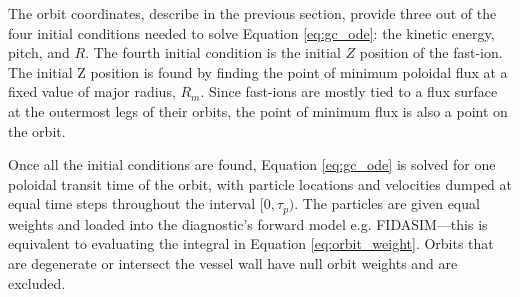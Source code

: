 The orbit coordinates, describe in the previous section, provide three out of the four initial conditions needed to solve Equation \ref{eq:gc_ode}: the kinetic energy, pitch, and $R$. The fourth initial condition is the initial $Z$ position of the fast-ion. The initial Z position is found by finding the point of minimum poloidal flux at a fixed value of major radius, $R_m$. Since fast-ions are mostly tied to a flux surface at the outermost legs of their orbits, the point of minimum flux is also a point on the orbit.

Once all the initial conditions are found, Equation \ref{eq:gc_ode} is solved for one poloidal transit time of the orbit, with particle locations and velocities dumped at equal time steps throughout the interval $[0,\tau_p)$. The particles are given equal weights and loaded into the diagnostic's forward model e.g. FIDASIM---this is equivalent to evaluating the integral in Equation \ref{eq:orbit_weight}. Orbits that are degenerate or intersect the vessel wall have null orbit weights and are excluded.

